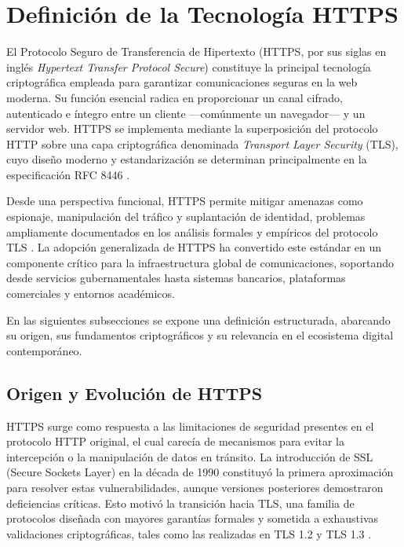 \section{Definición de la Tecnología HTTPS}

El Protocolo Seguro de Transferencia de Hipertexto (HTTPS, por sus siglas en inglés \textit{Hypertext Transfer Protocol Secure}) constituye la principal tecnología criptográfica empleada para garantizar comunicaciones seguras en la web moderna. Su función esencial radica en proporcionar un canal cifrado, autenticado e íntegro entre un cliente —comúnmente un navegador— y un servidor web. HTTPS se implementa mediante la superposición del protocolo HTTP sobre una capa criptográfica denominada \textit{Transport Layer Security} (TLS), cuyo diseño moderno y estandarización se determinan principalmente en la especificación RFC 8446 \cite{rfc8446}.

Desde una perspectiva funcional, HTTPS permite mitigar amenazas como espionaje, manipulación del tráfico y suplantación de identidad, problemas ampliamente documentados en los análisis formales y empíricos del protocolo TLS \cite{dowling2015, bhargavan2014}. La adopción generalizada de HTTPS ha convertido este estándar en un componente crítico para la infraestructura global de comunicaciones, soportando desde servicios gubernamentales hasta sistemas bancarios, plataformas comerciales y entornos académicos.

En las siguientes subsecciones se expone una definición estructurada, abarcando su origen, sus fundamentos criptográficos y su relevancia en el ecosistema digital contemporáneo.

\subsection{Origen y Evolución de HTTPS}

HTTPS surge como respuesta a las limitaciones de seguridad presentes en el protocolo HTTP original, el cual carecía de mecanismos para evitar la intercepción o la manipulación de datos en tránsito. La introducción de SSL (Secure Sockets Layer) en la década de 1990 constituyó la primera aproximación para resolver estas vulnerabilidades, aunque versiones posteriores demostraron deficiencias críticas. Esto motivó la transición hacia TLS, una familia de protocolos diseñada con mayores garantías formales y sometida a exhaustivas validaciones criptográficas, tales como las realizadas en TLS 1.2 y TLS 1.3 \cite{krawczyk2016, bhargavan2014}.

